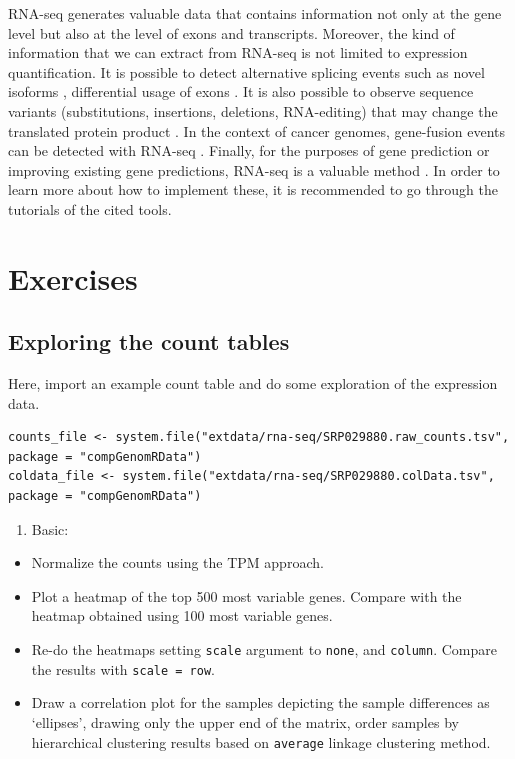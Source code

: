 \documentclass[12pt,]{krantz}
\providecommand{\tightlist}{%
  \setlength{\itemsep}{0pt}\setlength{\parskip}{0pt}}
\begin{document}
RNA-seq generates valuable data that contains information not only at the gene level but also at the level of exons and transcripts. Moreover, the kind of information that we can extract from RNA-seq is not limited to expression quantification. It is possible to detect alternative splicing events such as novel isoforms \citep{trapnell_transcript_2010}, differential usage of exons \citep{anders_detecting_2012} . It is also possible to observe sequence variants (substitutions, insertions, deletions, RNA-editing) that may change the translated protein product \citep{mckenna_genome_2010}. In the context of cancer genomes, gene-fusion events can be detected with RNA-seq \citep{mcpherson_defuse:_2011}. Finally, for the purposes of gene prediction or improving existing gene predictions, RNA-seq is a valuable method \citep{stanke_augustus:_2005}. In order to learn more about how to implement these, it is recommended to go through the tutorials of the cited tools.

\hypertarget{exercises-6}{%
\section{Exercises}\label{exercises-6}}

\hypertarget{exploring-the-count-tables}{%
\subsection{Exploring the count tables}\label{exploring-the-count-tables}}

Here, import an example count table and do some exploration of the expression data.

\begin{verbatim}
counts_file <- system.file("extdata/rna-seq/SRP029880.raw_counts.tsv", package = "compGenomRData")
coldata_file <- system.file("extdata/rna-seq/SRP029880.colData.tsv", package = "compGenomRData")
\end{verbatim}

\begin{enumerate}
\def\labelenumi{\arabic{enumi}.}
\tightlist
\item
  Basic:
\end{enumerate}

\begin{itemize}
\tightlist
\item
  Normalize the counts using the TPM approach.
\item
  Plot a heatmap of the top 500 most variable genes. Compare with the heatmap obtained using 100 most variable genes.
\item
  Re-do the heatmaps setting \texttt{scale} argument to \texttt{none}, and \texttt{column}. Compare the results with \texttt{scale\ =\ \textquotesingle{}row\textquotesingle{}}.
\item
  Draw a correlation plot for the samples depicting the sample differences as `ellipses', drawing only the upper end of the matrix, order samples by hierarchical clustering results based on \texttt{average} linkage clustering method.
\end{itemize}
\end{document}
